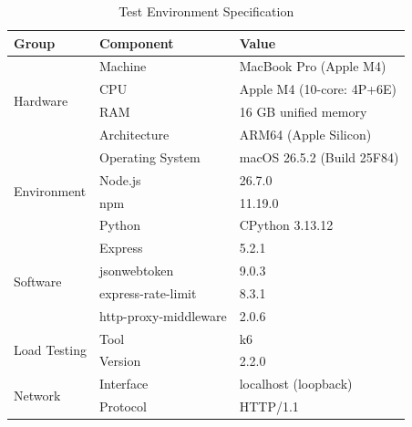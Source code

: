 \begin{table}[!ht]
  \centering
  \caption{Test Environment Specification}
  \label{tab:env-spec}
  \begin{tabular}{@{}llp{5cm}@{}}
    \toprule
    \textbf{Group} & \textbf{Component} & \textbf{Value} \\
    \midrule
    \multirow{4}{*}{Hardware} & Machine & MacBook Pro (Apple M4) \\
     & CPU & Apple M4 (10-core: 4P+6E) \\
     & RAM & 16 GB unified memory \\
     & Architecture & ARM64 (Apple Silicon) \\
    \midrule
    \multirow{4}{*}{Environment} & Operating System & macOS 26.5.2 (Build 25F84) \\
     & Node.js & 26.7.0 \\
     & npm & 11.19.0 \\
     & Python & CPython 3.13.12 \\
    \midrule
    \multirow{4}{*}{Software} & Express & 5.2.1 \\
     & jsonwebtoken & 9.0.3 \\
     & express-rate-limit & 8.3.1 \\
     & http-proxy-middleware & 2.0.6 \\
    \midrule
    \multirow{2}{*}{Load Testing} & Tool & k6 \\
     & Version & 2.2.0 \\
    \midrule
    \multirow{2}{*}{Network} & Interface & localhost (loopback) \\
     & Protocol & HTTP/1.1 \\
    \bottomrule
  \end{tabular}
\end{table}
